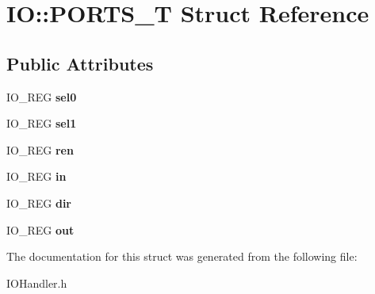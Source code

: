 \hypertarget{struct_i_o_1_1_p_o_r_t_s___t}{}\section{IO\+:\+:P\+O\+R\+T\+S\+\_\+T Struct Reference}
\label{struct_i_o_1_1_p_o_r_t_s___t}
\subsection*{Public Attributes}
\begin{DoxyCompactItemize}
\item 
\mbox{\label{struct_i_o_1_1_p_o_r_t_s___t_a2d2860bfc64f61ac2856644e51b35037}} 
I\+O\+\_\+\+R\+EG {\bfseries sel0}
\item 
\mbox{\label{struct_i_o_1_1_p_o_r_t_s___t_acf03d88f05988b3e1425b02d124f7038}} 
I\+O\+\_\+\+R\+EG {\bfseries sel1}
\item 
\mbox{\label{struct_i_o_1_1_p_o_r_t_s___t_a3fb9a174e5ec4ad15d3d44ba830ed580}} 
I\+O\+\_\+\+R\+EG {\bfseries ren}
\item 
\mbox{\label{struct_i_o_1_1_p_o_r_t_s___t_ad930a7b6b6a2295630c0f739aec41606}} 
I\+O\+\_\+\+R\+EG {\bfseries in}
\item 
\mbox{\label{struct_i_o_1_1_p_o_r_t_s___t_abe0932564054742bdd5ed9bf33807b79}} 
I\+O\+\_\+\+R\+EG {\bfseries dir}
\item 
\mbox{\label{struct_i_o_1_1_p_o_r_t_s___t_a326f7bc613a6e246b9b68b88804a8320}} 
I\+O\+\_\+\+R\+EG {\bfseries out}
\end{DoxyCompactItemize}


The documentation for this struct was generated from the following file\+:\begin{DoxyCompactItemize}
\item 
I\+O\+Handler.\+h\end{DoxyCompactItemize}
